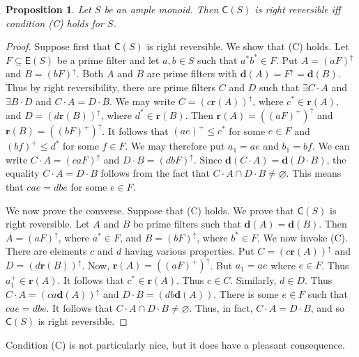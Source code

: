 \documentclass[a4paper]{amsart}
\newtheorem{proposition}[theorem]{Proposition}
\begin{document}
\begin{proposition}\label{prop:mary-anne} Let $S$ be an ample monoid.
Then $\mathsf{C}(S)$ is right reversible iff condition (C) holds for $S$.
\end{proposition}
\begin{proof} Suppose first that $\mathsf{C}(S)$ is right reversible.
We show that (C) holds.
Let $F \subseteq \mathsf{E}(S)$ be a prime filter and let $a, b \in S$
such that $a^{\ast}b^{\ast} \in F$. 
Put $A = (aF)^{\uparrow}$ and $B = (bF)^{\uparrow}$.
Both $A$ and $B$ are prime filters with $\mathbf{d}(A) = F^{\uparrow} = \mathbf{d}(B)$.
Thus by right reversibility, there are prime filters $C$ and $D$ such that $\exists C \cdot A$ and $\exists B \cdot D$ and $C \cdot A = D \cdot B$.
We may write $C = (c \mathbf{r}(A))^{\uparrow}$, where $c^{\ast} \in \mathbf{r}(A)$,
and $D = (d \mathbf{r}(B))^{\uparrow}$, where $d^{\ast} \in \mathbf{r}(B)$.
Then $\mathbf{r}(A) = ((aF)^{+})^{\uparrow}$ and $\mathbf{r}(B) = ((bF)^{+})^{\uparrow}$.
It follows that $(ae)^{+} \leq c^{\ast}$ for some $e \in F$
and $(bf)^{+} \leq d^{\ast}$ for some $f \in F$.
We may therefore put $a_{1} = ae$ and $b_{1} = bf$.
We can write $C \cdot A = (caF)^{\uparrow}$ and $D \cdot B = (dbF)^{\uparrow}$.
Since $\mathbf{d}(C \cdot A) = \mathbf{d}(D \cdot B)$,
the equality $C \cdot A = D \cdot B$ follows from the fact that $C \cdot A \cap D \cdot B \neq \varnothing$.
This means that $cae = dbe$ for some $e \in F$. 

We now prove the converse.
Suppose that (C) holds.
We prove that $\mathsf{C}(S)$ is right reversible.
Let $A$ and $B$ be prime filters such that $\mathbf{d}(A) = \mathbf{d}(B)$.
Then $A = (aF)^{\uparrow}$, where $a^{\ast} \in F$,
and $B = (bF)^{\uparrow}$, where $b^{\ast} \in F$.
We now invoke (C).
There are elements $c$ and $d$ having various properties.
Put $C = (c\mathbf{r}(A))^{\uparrow}$ and $D = (d\mathbf{r}(B))^{\uparrow}$.
Now, $\mathbf{r}(A) = ((aF)^{+})^{\uparrow}$.
But $a_{1} = ae$ where $e \in F$.
Thus $a_{1}^{+} \in  \mathbf{r}(A)$.
It follows that  $c^{\ast} \in \mathbf{r}(A)$.
Thus $c \in C$.
Similarly, $d \in D$.
Thus $C \cdot A = (ca \mathbf{d}(A))^{\uparrow}$ and $D \cdot B = (db\mathbf{d}(A))$.
There is some $e \in F$ such that $cae = dbe$.
It follows that $C \cdot A \cap D \cdot B \neq \varnothing$.
Thus, in fact, $C \cdot A = D \cdot B$, and so $\mathsf{C}(S)$ is right reversible. 
\end{proof}

Condition (C) is not particularly nice, but it does have a pleasant consequence.
\end{document}
